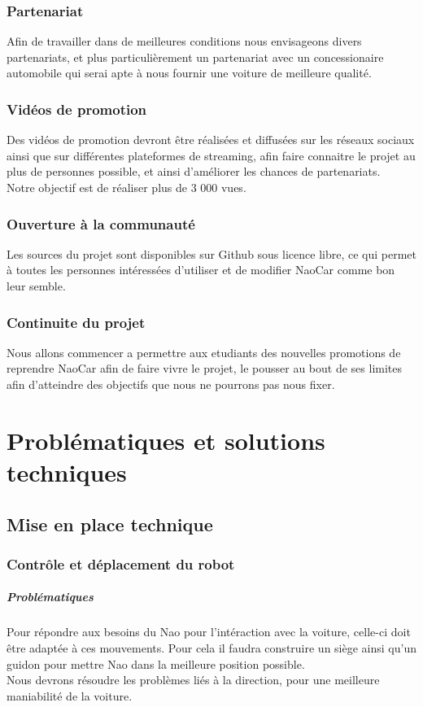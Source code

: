 \documentclass[11pt]{report} %
\begin{document}
		\subsection{Partenariat}
			Afin de travailler dans de meilleures conditions nous envisageons divers partenariats, et plus particulièrement un partenariat avec un concessionaire automobile qui serai apte à nous fournir une voiture de meilleure qualité.
		\subsection{Vidéos de promotion}
			Des vidéos de promotion devront être réalisées et diffusées sur les réseaux sociaux ainsi que sur différentes plateformes de streaming, afin faire connaitre le projet au plus de personnes possible, et ainsi d'améliorer les chances de partenariats.\\
			Notre objectif est de réaliser plus de 3 000 vues.
		\subsection{Ouverture à la communauté}
			Les sources du projet sont disponibles sur Github sous licence libre, ce qui permet à toutes les personnes intéressées d'utiliser et de modifier NaoCar comme bon leur semble.
		\subsection{Continuite du projet}
			Nous allons commencer a permettre aux etudiants des nouvelles promotions de reprendre NaoCar afin de faire vivre le projet, le pousser au bout de ses limites afin d'atteindre des objectifs que nous ne pourrons pas nous fixer.
\chapter{Problématiques et solutions techniques}
	\section{Mise en place technique}
		\subsection{Contrôle et déplacement du robot}
			\paragraph{Problématiques}
				Pour répondre aux besoins du Nao pour l'intéraction avec la voiture, celle-ci doit être adaptée à ces mouvements. Pour cela il faudra construire un siège ainsi qu'un guidon pour mettre Nao dans la meilleure position possible.\\
				Nous devrons résoudre les problèmes liés à la direction, pour une meilleure maniabilité de la voiture.
\end{document}
